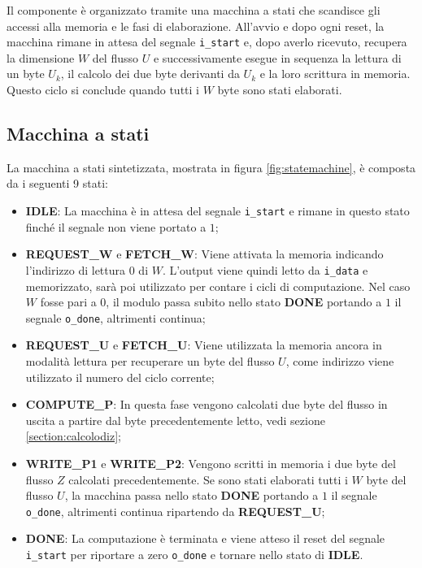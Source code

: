 Il componente è organizzato tramite una macchina a stati che scandisce gli accessi alla memoria e le fasi di elaborazione. All'avvio e dopo ogni reset, la macchina rimane in attesa del segnale \verb|i_start| e, dopo averlo ricevuto, recupera la dimensione $W$ del flusso $U$ e successivamente esegue in sequenza la lettura di un byte $U_k$, il calcolo dei due byte derivanti da $U_k$ e la loro scrittura in memoria. Questo ciclo si conclude quando tutti i $W$ byte sono stati elaborati.

\subsection{Macchina a stati}

La macchina a stati sintetizzata, mostrata in figura \ref{fig:statemachine}, è composta da i seguenti 9 stati:

\begin{itemize}
    \item \textbf{IDLE}: La macchina è in attesa del segnale \verb|i_start| e rimane in questo stato finché il segnale non viene portato a $1$;
    \item \textbf{REQUEST\_W} e \textbf{FETCH\_W}: Viene attivata la memoria indicando l'indirizzo di lettura $0$ di $W$. L'output viene quindi letto da \verb|i_data| e memorizzato, sarà poi utilizzato per contare i cicli di computazione. Nel caso $W$ fosse pari a $0$, il modulo passa subito nello stato \textbf{DONE} portando a $1$ il segnale \verb|o_done|, altrimenti continua;
    \item \textbf{REQUEST\_U} e \textbf{FETCH\_U}: Viene utilizzata la memoria ancora in modalità lettura per recuperare un byte del flusso $U$, come indirizzo viene utilizzato il numero del ciclo corrente;
    \item \textbf{COMPUTE\_P}: In questa fase vengono calcolati due byte del flusso in uscita a partire dal byte precedentemente letto, vedi sezione \ref{section:calcolodiz};
    \item \textbf{WRITE\_P1} e \textbf{WRITE\_P2}: Vengono scritti in memoria i due byte del flusso $Z$ calcolati precedentemente. Se sono stati elaborati tutti i $W$ byte del flusso $U$, la macchina passa nello stato \textbf{DONE} portando a $1$ il segnale \verb|o_done|, altrimenti continua ripartendo da \textbf{REQUEST\_U};
    \item \textbf{DONE}: La computazione è terminata e viene atteso il reset del segnale \verb|i_start| per riportare a zero \verb|o_done| e tornare nello stato di \textbf{IDLE}.
\end{itemize}

